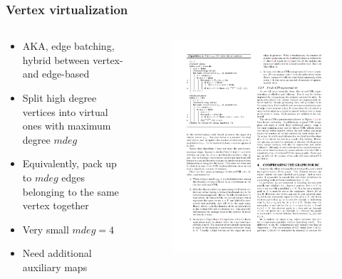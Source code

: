 \begin{frame}
  \frametitle{Vertex virtualization}

  \begin{columns}[onlytextwidth]
    \begin{column}{0.5\textwidth}
      \begin{itemize}
        \item AKA, edge batching, \\ hybrid between vertex- and edge-based
        \item Split high degree vertices into virtual ones with maximum degree $mdeg$
        \item Equivalently, pack up to $mdeg$ edges belonging to the same vertex together
        \item Very small $mdeg = 4$
        \item Need additional auxiliary maps
      \end{itemize}
    \end{column}

    \begin{column}{0.5\textwidth}
      \begin{figure}[t]
        \centering
        \includegraphics[width=\textwidth, height=0.8\textheight, keepaspectratio]{imgs/gpu-algo-hybrid}
      \end{figure}
    \end{column}
  \end{columns}

\end{frame}


